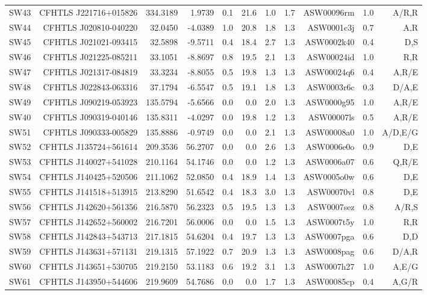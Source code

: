 \documentclass[useAMS,usenatbib,a4paper]{mn2e}
\begin{document}
\begin{center}
\begin{longtable}{lrrrrrrrrrr}
SW43 & CFHTLS J221716+015826 &  334.3189 &    1.9739 &  0.1 & 21.6 &  1.0 &  1.7 & ASW00096rm &  1.0  &  A/R,R   \\
SW44 & CFHTLS J020810-040220 &   32.0450 &   -4.0389 &  1.0 & 20.8 &  1.8 &  1.3 & ASW0001c3j &  0.7  &  A,R   \\
SW45 & CFHTLS J021021-093415 &   32.5898 &   -9.5711 &  0.4 & 18.4 &  2.7 &  1.3 & ASW0002k40 &  0.4  &  D,S   \\
SW46 & CFHTLS J021225-085211 &   33.1051 &   -8.8697 &  0.8 & 19.5 &  2.1 &  1.3 & ASW00024id &  1.0  &  R,R   \\
SW47 & CFHTLS J021317-084819 &   33.3234 &   -8.8055 &  0.5 & 19.8 &  1.3 &  1.3 & ASW00024q6 &  0.4  &  A,R/E   \\
SW48 & CFHTLS J022843-063316 &   37.1794 &   -6.5547 &  0.5 & 19.1 &  1.8 &  1.3 & ASW0003r6c &  0.3  &  D/A,E   \\
SW49 & CFHTLS J090219-053923 &  135.5794 &   -5.6566 &  0.0 &  0.0 &  2.0 &  1.3 & ASW0000g95 &  1.0  &  A,R/E   \\
SW40 & CFHTLS J090319-040146 &  135.8311 &   -4.0297 &  0.0 & 19.8 &  1.2 &  1.3 & ASW00007ls &  0.5  &  A,R/E   \\
SW51 & CFHTLS J090333-005829 &  135.8886 &   -0.9749 &  0.0 &  0.0 &  2.1 &  1.3 & ASW00008a0 &  1.0  &  A/D,E/G   \\
SW52 & CFHTLS J135724+561614 &  209.3536 &   56.2707 &  0.0 &  0.0 &  2.6 &  1.3 & ASW0006e0o &  0.9  &  D,E   \\
SW53 & CFHTLS J140027+541028 &  210.1164 &   54.1746 &  0.0 &  0.0 &  1.2 &  1.3 & ASW0006a07 &  0.6  &  Q,R/E   \\
SW54 & CFHTLS J140425+520506 &  211.1062 &   52.0850 &  0.4 & 18.9 &  1.4 &  1.3 & ASW0005o0w &  0.6  &  D,E   \\
SW55 & CFHTLS J141518+513915 &  213.8290 &   51.6542 &  0.4 & 18.3 &  3.0 &  1.3 & ASW00070vl &  0.8  &  D,E   \\
SW56 & CFHTLS J142620+561356 &  216.5870 &   56.2323 &  0.5 & 19.5 &  1.3 &  1.3 & ASW0007sez &  0.8  &  A/R,S   \\
SW57 & CFHTLS J142652+560002 &  216.7201 &   56.0006 &  0.0 &  0.0 &  1.5 &  1.3 & ASW0007t5y &  1.0  &  R,R   \\
SW58 & CFHTLS J142843+543713 &  217.1815 &   54.6204 &  0.4 & 19.7 &  1.3 &  1.3 & ASW0007pga &  0.6  &  D,D   \\
SW59 & CFHTLS J143631+571131 &  219.1315 &   57.1922 &  0.7 & 20.9 &  1.3 &  1.3 & ASW0008pag &  0.6  &  D/A,R   \\
SW60 & CFHTLS J143651+530705 &  219.2150 &   53.1183 &  0.6 & 19.2 &  3.1 &  1.3 & ASW0007h27 &  1.0  &  A,E/G   \\
SW61 & CFHTLS J143950+544606 &  219.9609 &   54.7686 &  0.0 &  0.0 &  1.7 &  1.3 & ASW00085cp &  0.4  &  A,G/R   \\
\end{longtable}
\end{center}
\end{document}
